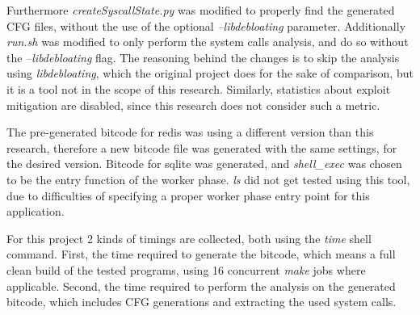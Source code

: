 Furthermore \textit{createSyscallState.py} was modified to properly find the generated CFG files, without the use of the optional \textit{--libdebloating} parameter.
Additionally \textit{run.sh} was modified to only perform the system calls analysis, and do so without the \textit{--libdebloating} flag.
The reasoning behind the changes is to skip the analysis using \textit{libdebloating}, which the original project does for the sake of comparison, but it is a tool not in the scope of this research.
Similarly, statistics about exploit mitigation are disabled, since this research does not consider such a metric.

The pre-generated bitcode for redis was using a different version than this research, therefore a new bitcode file was generated with the same settings, for the desired version.
Bitcode for sqlite was generated, and \textit{shell\_exec} was chosen to be the entry function of the worker phase.
\textit{ls} did not get tested using this tool, due to difficulties of specifying a proper worker phase entry point for this application.

For this project 2 kinds of timings are collected, both using the \textit{time} shell command.
First, the time required to generate the bitcode, which means a full clean build of the tested programs, using 16 concurrent \textit{make} jobs where applicable.
Second, the time required to perform the analysis on the generated bitcode, which includes CFG generations and extracting the used system calls.
